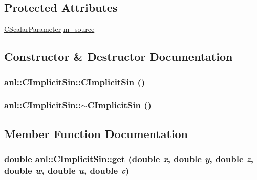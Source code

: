 \subsection*{Protected Attributes}
\begin{DoxyCompactItemize}
\item 
\hyperlink{classanl_1_1CScalarParameter}{CScalarParameter} \hyperlink{classanl_1_1CImplicitSin_a52a087c6a69b0a7c6c0cbc8e7651b0f7}{m\_\-source}
\end{DoxyCompactItemize}


\subsection{Constructor \& Destructor Documentation}
\hypertarget{classanl_1_1CImplicitSin_a3ff5eeabfdaebf15ed25cd3903c6e093}{
\subsubsection[{CImplicitSin}]{\setlength{\rightskip}{0pt plus 5cm}anl::CImplicitSin::CImplicitSin ()}}
\label{classanl_1_1CImplicitSin_a3ff5eeabfdaebf15ed25cd3903c6e093}
\hypertarget{classanl_1_1CImplicitSin_a38a91b4da37aed48c9604d635e6cd94f}{
\subsubsection[{$\sim$CImplicitSin}]{\setlength{\rightskip}{0pt plus 5cm}anl::CImplicitSin::$\sim$CImplicitSin ()}}
\label{classanl_1_1CImplicitSin_a38a91b4da37aed48c9604d635e6cd94f}


\subsection{Member Function Documentation}
\hypertarget{classanl_1_1CImplicitSin_ace607a9e9526483fe588e3e7355e1b77}{
\subsubsection[{get}]{\setlength{\rightskip}{0pt plus 5cm}double anl::CImplicitSin::get (double {\em x}, \/  double {\em y}, \/  double {\em z}, \/  double {\em w}, \/  double {\em u}, \/  double {\em v})}}
\label{classanl_1_1CImplicitSin_ace607a9e9526483fe588e3e7355e1b77}


